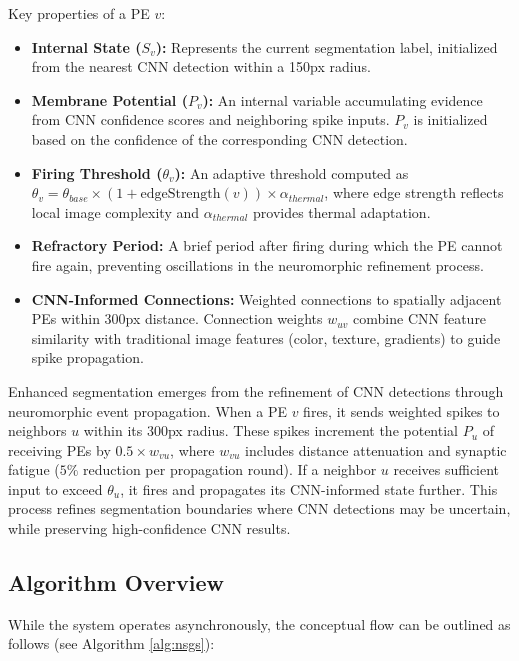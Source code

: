 \documentclass[conference]{IEEEtran}
\begin{document}
Key properties of a PE \(v\):
\begin{itemize}
    \item \textbf{Internal State (\(S_v\)):} Represents the current segmentation label, initialized from the nearest CNN detection within a 150px radius.
    \item \textbf{Membrane Potential (\(P_v\)):} An internal variable accumulating evidence from CNN confidence scores and neighboring spike inputs. \(P_v\) is initialized based on the confidence of the corresponding CNN detection.
    \item \textbf{Firing Threshold (\(\theta_v\)):} An adaptive threshold computed as \(\theta_v = \theta_{base} \times (1 + \text{edgeStrength}(v)) \times \alpha_{thermal}\), where edge strength reflects local image complexity and \(\alpha_{thermal}\) provides thermal adaptation.
    \item \textbf{Refractory Period:} A brief period after firing during which the PE cannot fire again, preventing oscillations in the neuromorphic refinement process.
    \item \textbf{CNN-Informed Connections:} Weighted connections to spatially adjacent PEs within 300px distance. Connection weights \(w_{uv}\) combine CNN feature similarity with traditional image features (color, texture, gradients) to guide spike propagation.
\end{itemize}

Enhanced segmentation emerges from the refinement of CNN detections through neuromorphic event propagation. When a PE \(v\) fires, it sends weighted spikes to neighbors \(u\) within its 300px radius. These spikes increment the potential \(P_u\) of receiving PEs by \(0.5 \times w_{vu}\), where \(w_{vu}\) includes distance attenuation and synaptic fatigue (\(5\%\) reduction per propagation round). If a neighbor \(u\) receives sufficient input to exceed \(\theta_u\), it fires and propagates its CNN-informed state further. This process refines segmentation boundaries where CNN detections may be uncertain, while preserving high-confidence CNN results.

\subsection{Algorithm Overview}

While the system operates asynchronously, the conceptual flow can be outlined as follows (see Algorithm \ref{alg:nsgs}):
\end{document}
